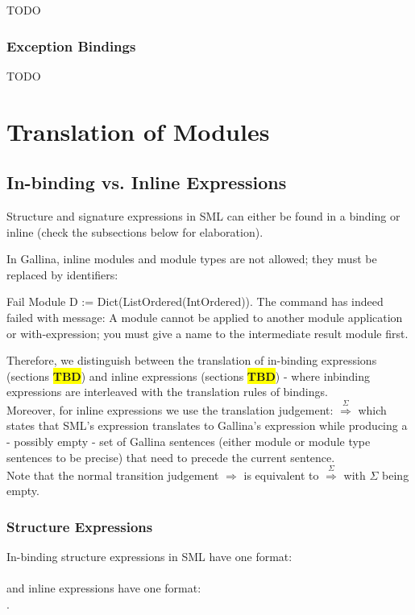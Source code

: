 \documentclass[a4paper,11pt]{article}
\newcommand\stog{\boldsymbol{\Longrightarrow}}
\newcommand{\stoga}[1]{\overset{#1}{\boldsymbol{\Longrightarrow}}}
\newcommand{\tbd}{\colorbox{yellow}{\textbf{TBD}}}
\begin{document}
TODO

\subsubsection{Exception Bindings}

TODO
\newpage

\section{Translation of Modules}
\subsection{In-binding vs. Inline Expressions}
Structure and signature expressions in SML can either be found in a binding or inline (check the subsections below for elaboration). 

In Gallina, inline modules and module types are not allowed; they must be replaced by identifiers:
\begin{coq}
Fail Module D := Dict(ListOrdered(IntOrdered)).
The command has indeed failed with message:
A module cannot be applied to another module application or with-expression; 
you must give a name to the intermediate result module first.
\end{coq}
Therefore, we distinguish between the translation of in-binding expressions (sections \tbd) and inline expressions (sections \tbd) - where inbinding expressions are interleaved with the translation rules of bindings.\\
Moreover, for inline expressions we use the translation judgement:  $\stoga{\Sigma}$  which states that SML's expression  translates to Gallina's expression  while producing a - possibly empty - set of Gallina sentences (either module or module type sentences to be precise) that need to precede the current sentence.\\
Note that the normal transition judgement $\stog$ is equivalent to $\stoga{\Sigma}$ with $\Sigma$ being empty.
\subsubsection{Structure Expressions}
In-binding structure expressions in SML have one format:\\
\\
and inline expressions have one format:\\
.
\end{document}
